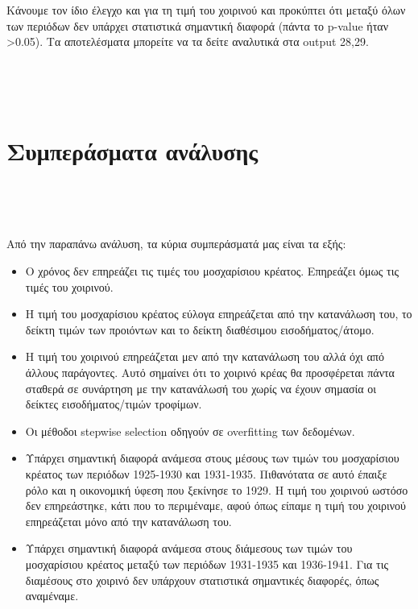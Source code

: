 \documentclass[10pt]{article}
\begin{document}
\

\

 Κάνουμε τον ίδιο έλεγχο και για τη τιμή του χοιρινού και προκύπτει ότι μεταξύ όλων των περιόδων δεν υπάρχει στατιστικά σημαντική διαφορά (πάντα το p-value ήταν >0.05). Τα αποτελέσματα μπορείτε να τα δείτε αναλυτικά στα output 28,29.





\



\ 


\section{Συμπεράσματα ανάλυσης}

\ 


\ 

Από την παραπάνω ανάλυση, τα κύρια συμπεράσματά μας είναι τα εξής:



\begin{itemize}
    \item Ο χρόνος δεν επηρεάζει τις τιμές του μοσχαρίσιου κρέατος. Επηρεάζει όμως τις τιμές του χοιρινού.
    \item Η τιμή του μοσχαρίσιου κρέατος εύλογα επηρεάζεται από την κατανάλωση του, το δείκτη τιμών των προιόντων και το δείκτη διαθέσιμου εισοδήματος/άτομο.
    \item Η τιμή του χοιρινού επηρεάζεται μεν από την κατανάλωση του αλλά όχι από άλλους παράγοντες. Αυτό σημαίνει ότι το χοιρινό κρέας θα προσφέρεται πάντα σταθερά σε συνάρτηση με την κατανάλωσή του χωρίς να έχουν σημασία οι δείκτες εισοδήματος/τιμών τροφίμων.
    \item Οι μέθοδοι stepwise selection οδηγούν σε overfitting των δεδομένων.
    \item Υπάρχει σημαντική διαφορά ανάμεσα στους μέσους των τιμών του μοσχαρίσιου κρέατος των περιόδων 1925-1930 και 1931-1935. Πιθανότατα σε αυτό έπαιξε ρόλο και η οικονομική ύφεση που ξεκίνησε το 1929. Η τιμή του χοιρινού ωστόσο δεν επηρεάστηκε, κάτι που το περιμέναμε, αφού όπως είπαμε η τιμή του χοιρινού επηρεάζεται μόνο από την κατανάλωση του.
    \item Υπάρχει σημαντική διαφορά ανάμεσα στους διάμεσους των τιμών του μοσχαρίσιου κρέατος μεταξύ των περιόδων 1931-1935 και 1936-1941. Για τις διαμέσους στο χοιρινό δεν υπάρχουν στατιστικά σημαντικές διαφορές, όπως αναμέναμε.
\end{itemize}
\end{document}
